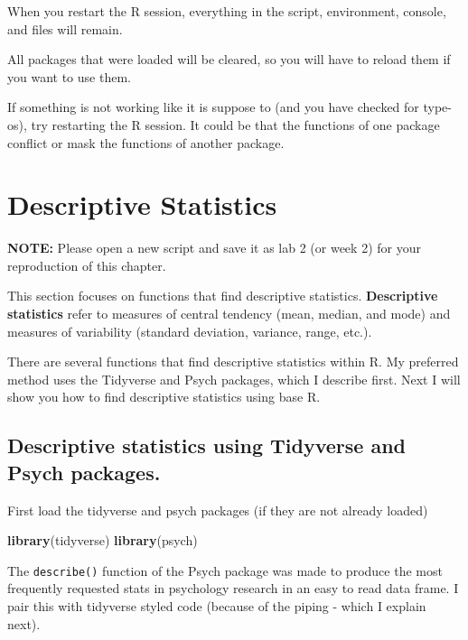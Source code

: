 \documentclass[
]{book}
\newenvironment{Shaded}{\begin{snugshade}}{\end{snugshade}}
\newcommand{\KeywordTok}[1]{\textcolor[rgb]{0.13,0.29,0.53}{\textbf{#1}}}
\newcommand{\NormalTok}[1]{#1}
\begin{document}
When you restart the R session, everything in the script, environment, console, and files will remain.

All packages that were loaded will be cleared, so you will have to reload them if you want to use them.

If something is not working like it is suppose to (and you have checked for type-os), try restarting the R session. It could be that the functions of one package conflict or mask the functions of another package.

\hypertarget{descriptive-statistics}{%
\chapter{Descriptive Statistics}\label{descriptive-statistics}}

\textbf{NOTE:} Please open a new script and save it as lab 2 (or week 2) for your reproduction of this chapter.

This section focuses on functions that find descriptive statistics. \textbf{Descriptive statistics} refer to measures of central tendency (mean, median, and mode) and measures of variability (standard deviation, variance, range, etc.).

There are several functions that find descriptive statistics within R. My preferred method uses the Tidyverse and Psych packages, which I describe first. Next I will show you how to find descriptive statistics using base R.

\hypertarget{descriptive-statistics-using-tidyverse-and-psych-packages.}{%
\section{Descriptive statistics using Tidyverse and Psych packages.}\label{descriptive-statistics-using-tidyverse-and-psych-packages.}}

First load the tidyverse and psych packages (if they are not already loaded)

\begin{Shaded}
\begin{Highlighting}[]
\KeywordTok{library}\NormalTok{(tidyverse)}
\KeywordTok{library}\NormalTok{(psych)}
\end{Highlighting}
\end{Shaded}

The \texttt{describe()} function of the Psych package was made to produce the most frequently requested stats in psychology research in an easy to read data frame. I pair this with tidyverse styled code (because of the piping - which I explain next).
\end{document}

